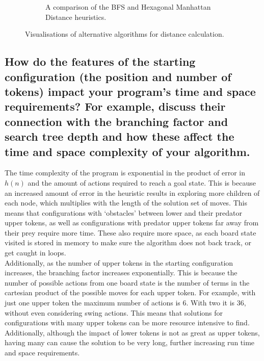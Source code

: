 \documentclass{article}
\begin{document}
\begin{figure}[]
\begin{subfigure}[b]{0.42\linewidth}
      \caption{A comparison of the BFS and Hexagonal Manhattan Distance heuristics.}
      \label{fig: hex manhattan BFS}
    \end{subfigure}
    \caption{Visualisations of alternative algorithms for distance calculation.}
\end{figure}

\newpage
\subsection*{How do the features of the starting configuration (the position and number of tokens) impact your program’s time and space requirements? For example, discuss their connection with the branching factor and search tree depth and how these affect the time and space complexity of your algorithm.}
The time complexity of the program is exponential in the product of error in $h(n)$ and the amount of actions required to reach a goal state. This is because an increased amount of error in the heuristic results in exploring more children of each node, which multiplies with the length of the solution set of moves. This means that configurations with ‘obstacles’ between lower and their predator upper tokens, as well as configurations with predator upper tokens far away from their prey require more time. These also require more space, as each board state visited is stored in memory to make sure the algorithm does not back track, or get caught in loops.\\[2mm]
Additionally, as the number of upper tokens in the starting configuration increases, the branching factor increases exponentially. This is because the number of possible actions from one board state is the number of terms in the cartesian product of the possible moves for each upper token. For example, with just one upper token the maximum number of actions is 6. With two it is 36, without even considering swing actions. This means that solutions for configurations with many upper tokens can be more resource intensive to find. Additionally, although the impact of lower tokens is not as great as upper tokens, having many can cause the solution to be very long, further increasing run time and space requirements.
\end{document}
